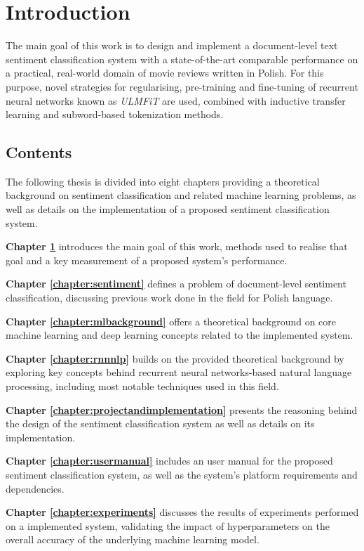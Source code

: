 \chapter{Introduction}
\label{chapter:introduction}

The main goal of this work is to design and implement a document-level text sentiment classification system with a state-of-the-art comparable performance on a practical, real-world domain of movie reviews written in Polish. For this purpose, novel strategies for regularising, pre-training and fine-tuning of recurrent neural networks known as \emph{ULMFiT} are used, combined with inductive transfer learning and subword-based tokenization methods. 

\section{Contents}

The following thesis is divided into eight chapters providing a theoretical background on sentiment classification and related machine learning problems, as well as details on the implementation of a proposed sentiment classification system.

\textbf{Chapter \ref{chapter:introduction}} introduces the main goal of this work, methods used to realise that goal and a key measurement of a proposed system's performance.

\textbf{Chapter \ref{chapter:sentiment}} defines a problem of document-level sentiment classification, discussing previous work done in the field for Polish language.

\textbf{Chapter \ref{chapter:mlbackground}} offers a theoretical background on core machine learning and deep learning concepts related to the implemented system.

\textbf{Chapter \ref{chapter:rnnnlp}} builds on the provided theoretical background by exploring key concepts behind recurrent neural networks-based natural language processing, including most notable techniques used in this field.

\textbf{Chapter \ref{chapter:projectandimplementation}} presents the reasoning behind the design of the sentiment classification system as well as details on its implementation.

\textbf{Chapter \ref{chapter:usermanual}} includes an user manual for the proposed sentiment classification system, as well as the system's platform requirements and dependencies.

\textbf{Chapter \ref{chapter:experiments}} discusses the results of experiments performed on a implemented system, validating the impact of hyperparameters on the overall accuracy of the underlying machine learning model.

